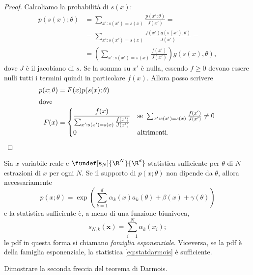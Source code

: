 \begin{proof}
	Calcoliamo la probabilità di $s(x)$:
	\begin{align*}
		p(s(x);\theta)
		&= \sum_{x':s(x')=s(x)} \frac{p(x';\theta)}{J(x')} = \\
		&= \sum_{x':s(x')=s(x)} \frac{f(x') g(s(x'),\theta)}{J(x')} = \\
		&= \left( \sum_{x':s(x')=s(x)} \frac{f(x')}{J(x')} \right) g(s(x),\theta),
	\end{align*}
	dove $J$ è il jacobiano di $s$.
	Se la somma su $x'$ è nulla,
	essendo $f\ge 0$ devono essere nulli tutti i termini quindi in particolare $f(x)$.
	Allora posso scrivere
	\begin{align*}
		p(x;\theta)
		&= F(x) p(s(x);\theta) \\
		\intertext{dove}
		F(x)
		&= \begin{cases}
			\displaystyle\frac{f(x)}{\sum_{x':s(x')=s(x)} \frac{f(x')}{J(x')}}
			& \text{se }\sum_{x':s(x')=s(x)} \frac{f(x')}{J(x')} \neq 0 \\
			0 & \text{altrimenti.}
		\end{cases} \qedhere
	\end{align*}
\end{proof}

\begin{fact}
	\label{th:darmois}
	Sia $x$ variabile reale e $\fundef[\mathbf s_N]{\R^N}{\R^d}$ statistica sufficiente per $\theta$ di $N$ estrazioni di $x$ per ogni $N$.
	Se il supporto di $p(x;\theta)$ non dipende da $\theta$, allora necessariamente
	\begin{equation*}
		p(x;\theta) =
		\exp \left( \sum_{k=1}^d \alpha_k(x)a_k(\theta) + \beta(x) + \gamma(\theta) \right)
	\end{equation*}
	e la statistica sufficiente è, a meno di una funzione biunivoca,
	\begin{equation}
		\label{eq:statdarmois}
		s_{N,k}(\mathbf x) = \sum_{i=1}^{N} \alpha_k(x_i);
	\end{equation}
	le pdf in questa forma si chiamano \emph{famiglia esponenziale}.
	Viceversa, se la pdf è della famiglia esponenziale, la statistica \eqref{eq:statdarmois} è sufficiente.
\end{fact}

\begin{exercise}
	Dimostrare la seconda freccia del teorema di Darmois.
\end{exercise}

